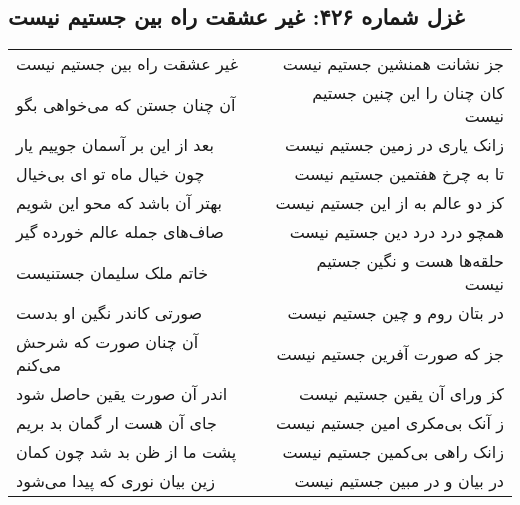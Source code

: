 \begin{center}
\section*{غزل شماره ۴۲۶: غیر عشقت راه بین جستیم نیست}
\label{sec:0426}
\begin{longtable}{l p{0.5cm} r}
غیر عشقت راه بین جستیم نیست
&&
جز نشانت همنشین جستیم نیست
\\
آن چنان جستن که می‌خواهی بگو
&&
کان چنان را این چنین جستیم نیست
\\
بعد از این بر آسمان جوییم یار
&&
زانک یاری در زمین جستیم نیست
\\
چون خیال ماه تو ای بی‌خیال
&&
تا به چرخ هفتمین جستیم نیست
\\
بهتر آن باشد که محو این شویم
&&
کز دو عالم به از این جستیم نیست
\\
صاف‌های جمله عالم خورده گیر
&&
همچو درد درد دین جستیم نیست
\\
خاتم ملک سلیمان جستنیست
&&
حلقه‌ها هست و نگین جستیم نیست
\\
صورتی کاندر نگین او بدست
&&
در بتان روم و چین جستیم نیست
\\
آن چنان صورت که شرحش می‌کنم
&&
جز که صورت آفرین جستیم نیست
\\
اندر آن صورت یقین حاصل شود
&&
کز ورای آن یقین جستیم نیست
\\
جای آن هست ار گمان بد بریم
&&
ز آنک بی‌مکری امین جستیم نیست
\\
پشت ما از ظن بد شد چون کمان
&&
زانک راهی بی‌کمین جستیم نیست
\\
زین بیان نوری که پیدا می‌شود
&&
در بیان و در مبین جستیم نیست
\\
\end{longtable}
\end{center}
